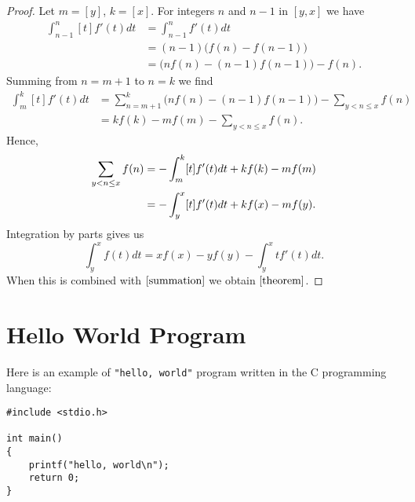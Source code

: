 \documentclass{article}
\begin{document}
\begin{proof}
Let \( m = [y] \), \( k = [x] \). For integers \( n \) and \( n - 1 \)
in \( [y, x] \) we have
\begin{align*}
\int_{n-1}^n [t] f'(t) dt & = \int_{n-1}^n f'(t) dt \\
                          & = (n - 1) \bigl( f(n) - f(n - 1)
                                      \bigr) \\
                          & = \bigl(
                                n f(n) - (n - 1) f(n - 1)
                              \bigr) - f(n).
\end{align*}
Summing from \( n = m + 1 \) to \( n = k \) we find
\begin{align*}
\int_{m}^k [t] f'(t) dt & = \sum_{n = m + 1}^k \bigl(
                                n f(n) - (n - 1) f(n - 1)
                            \bigr) - \sum_{y < n \le x} f(n) \\
                        & = k f(k) - m f(m) -
                            \sum_{y < n \le x} f(n).
\end{align*}
Hence,
\begin{align}
\sum_{y < n \le x} f(n) & = - \int_{m}^k [t] f'(t) dt +
                              k f(k) - m f(m) \notag \\
                        & = - \int_{y}^x [t] f'(t) dt +
                              k f(x) - m f(y).
\label{summation}
\end{align}
Integration by parts gives us
\begin{equation*}
\int_y^x f(t) dt = x f(x) - y f(y) - \int_y^x t f'(t) dt.
\end{equation*}
When this is combined with \( \eqref{summation} \) we obtain
\( \eqref{theorem} \).
\end{proof}


\section{Hello World Program}

Here is an example of \texttt{"hello, world"} program written in the C
programming language:

\begin{verbatim}
#include <stdio.h>

int main()
{
    printf("hello, world\n");
    return 0;
}
\end{verbatim}
\end{document}
